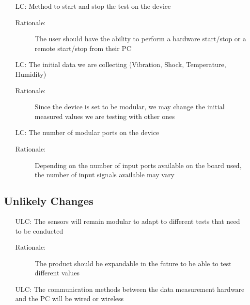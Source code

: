 \documentclass[12pt]{article}
\newcounter{lcnum} %
\newcounter{ulcnum}
\begin{document}
\noindent \begin{itemize}
\item[LC\refstepcounter{lcnum}\thelcnum:] Method to start and stop the test on the device
\begin{description} \item[Rationale:] The user should have the ability to perform a hardware start/stop or a remote start/stop from their PC \end{description}

\item[LC\refstepcounter{lcnum}\thelcnum:] The initial data we are collecting (Vibration, Shock, Temperature, Humidity)
\begin{description} \item[Rationale:] Since the device is set to be modular, we may change the initial measured values we are testing with other ones \end{description}

\item[LC\refstepcounter{lcnum}\thelcnum:] The number of modular ports on the device
\begin{description} \item[Rationale:] Depending on the number of input ports available on the board used, the number of input signals available may vary \end{description}


\end{itemize}

\subsection{Unlikely Changes}    

\noindent \begin{itemize}

\item[ULC\refstepcounter{ulcnum}\theulcnum:] The sensors will remain modular to adapt to different tests that need to be conducted
\begin{description} \item[Rationale:] The product should be expandable in the future to be able to test different values \end{description}

\item[ULC\refstepcounter{ulcnum}\theulcnum:] The communication methods between the data measurement hardware and the PC will be wired or wireless


\end{itemize}
\end{document}
